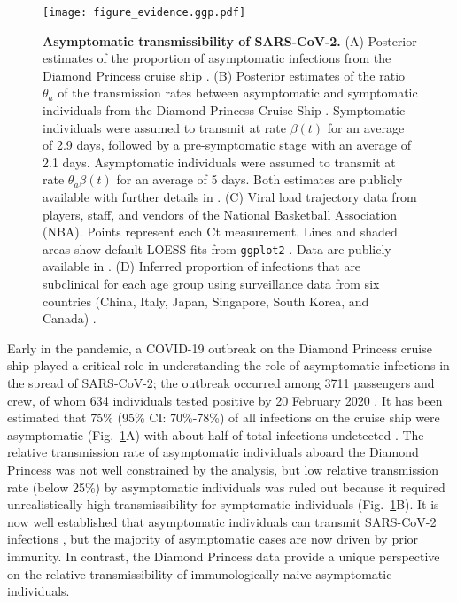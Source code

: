 \documentclass[12pt]{article}
\newcommand{\fref}[1]{Fig.~\ref{fig:#1}}
\begin{document}
\begin{figure}[!ht]
\texttt{[image: figure\_evidence.ggp.pdf]}
\caption{
\textbf{Asymptomatic transmissibility of SARS-CoV-2.}
(A) Posterior estimates of the proportion of asymptomatic infections from the Diamond Princess cruise ship \cite{emery2020}.
(B) Posterior estimates of the ratio $\theta_a$ of the transmission rates between asymptomatic and symptomatic individuals from the Diamond Princess Cruise Ship \cite{emery2020}.
Symptomatic individuals were assumed to transmit at rate $\beta(t)$ for an average of 2.9 days, followed by a pre-symptomatic stage with an average of 2.1 days. 
Asymptomatic individuals were assumed to transmit at rate $\theta_a \beta(t)$ for an average of 5 days.
Both estimates are publicly available with further details in \cite{emery2020}.
(C) Viral load trajectory data from players, staff, and vendors of the National Basketball Association (NBA).
Points represent each Ct measurement.
Lines and shaded areas show default LOESS fits from \texttt{ggplot2} \cite{ggplot2}.
Data are publicly available in \cite{Kissler2020}.
(D) Inferred proportion of infections that are subclinical for each age group using surveillance data from six countries (China, Italy, Japan, Singapore, South Korea, and Canada) \cite{davies2020}.
}
\label{fig:evidence}
\end{figure}

Early in the pandemic, a COVID-19 outbreak on the Diamond Princess cruise ship played a critical role in understanding the role of asymptomatic infections in the spread of SARS-CoV-2;
the outbreak occurred among 3711 passengers and crew, of whom 634 individuals tested positive by 20 February 2020 \cite{mizumoto2020estimating}.
It has been estimated that 75\% (95\% CI: 70\%-78\%) of all infections on the cruise ship were asymptomatic (\fref{evidence}A) with about half of total infections undetected \cite{emery2020}.
The relative transmission rate of asymptomatic individuals aboard the Diamond Princess was not well constrained by the analysis, but low relative transmission rate (below 25\%) by asymptomatic individuals was ruled out because it required unrealistically high transmissibility for symptomatic individuals (\fref{evidence}B).
It is now well established that asymptomatic individuals can transmit SARS-CoV-2 infections \citep{gao2021role,johansson2021sars,subramanian2021quantifying,koelle2022changing,lizewski2022navy}, but the majority of asymptomatic cases are now driven by prior immunity.
In contrast, the Diamond Princess data provide a unique perspective on the relative transmissibility of immunologically naive asymptomatic individuals.
\end{document}
